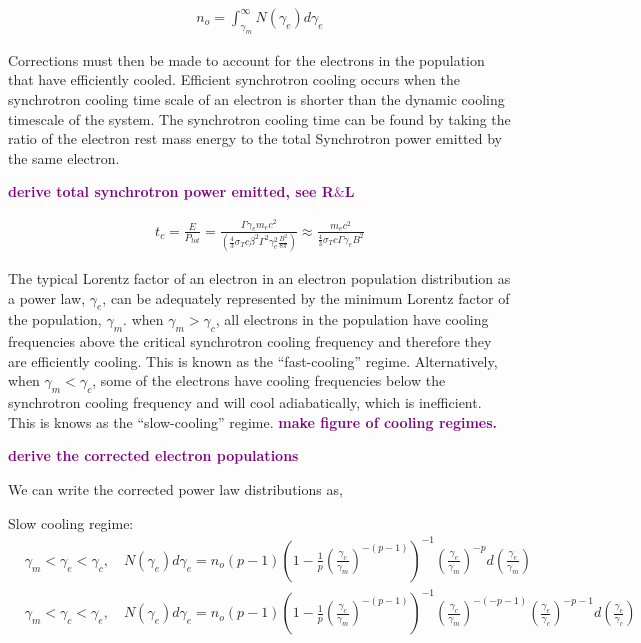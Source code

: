 \documentclass[linenumbers,twocolumn]{aastex631}
\newcommand{\mm}[1]{{\textcolor{purple}{\bf #1}}}
\begin{document}
\begin{appendix}
\begin{align}
	n_o = \int_{\gamma_m}^{\infty} N(\gamma_e) d\gamma_e
\end{align}

Corrections must then be made to account for the electrons in the population that have efficiently cooled. Efficient synchrotron cooling occurs when the synchrotron cooling time scale of an electron is shorter than the dynamic cooling timescale of the system. The synchrotron cooling time can be found by taking the ratio of the electron rest mass energy to the total Synchrotron power emitted by the same electron.

\mm{derive total synchrotron power emitted, see R$\&$L}

\begin{align}
	t_{c} = \frac{E}{P_{tot}} = \frac{\Gamma \gamma_e m_e c^2}{\left(\frac{4}{3} \sigma_T c \beta^2 \Gamma^2 \gamma_e^2 \frac{B^2}{8\pi}\right)} \approx \frac{m_e c^2}{\frac{4}{3}\sigma_T c \Gamma \gamma_e B^2}
\end{align} 

The typical Lorentz factor of an electron in an electron population distribution as a power law, $\gamma_e$, can be adequately represented by the minimum Lorentz factor of the population, $\gamma_m$. when $\gamma_m > \gamma_c$, all electrons in the population have cooling frequencies above the critical synchrotron cooling frequency and therefore they are efficiently cooling. This is known as the ``fast-cooling'' regime. Alternatively, when $\gamma_m < \gamma_c$, some of the electrons have cooling frequencies below the synchrotron cooling frequency and will cool adiabatically, which is inefficient. This is knows as the ``slow-cooling'' regime. \mm{make figure of cooling regimes.} 

\mm{derive the corrected electron populations}

We can write the corrected power law distributions as, 

Slow cooling regime:
\begin{align}
	&\gamma_m < \gamma_e < \gamma_c,\quad N(\gamma_e)d\gamma_e = n_o (p-1) \left(1 - \frac{1}{p} \left(\frac{\gamma_c}{\gamma_m}\right)^{-(p-1)}\right)^{-1} \left(\frac{\gamma_e}{\gamma_m}\right)^{-p} d\left(\frac{\gamma_e}{\gamma_m}\right)\\
	&\gamma_m < \gamma_c < \gamma_e,\quad N(\gamma_e)d\gamma_e = n_o (p-1) \left(1 - \frac{1}{p} \left(\frac{\gamma_c}{\gamma_m}\right)^{-(p-1)}\right)^{-1} \left(\frac{\gamma_c}{\gamma_m}\right)^{-(-p-1)}\left(\frac{\gamma_e}{\gamma_c}\right)^{-p-1} d\left(\frac{\gamma_e}{\gamma_c}\right)
\end{align}


\end{appendix}
\end{document}
